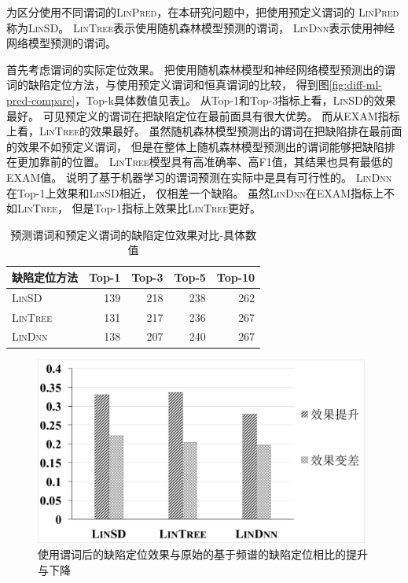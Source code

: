 为区分使用不同谓词的\textsc{LinPred}，在本研究问题中，把使用预定义谓词的 \textsc{LinPred} 称为\textsc{LinSD}。
\textsc{LinTree}表示使用随机森林模型预测的谓词，
\textsc{LinDnn}表示使用神经网络模型预测的谓词。

首先考虑谓词的实际定位效果。
把使用随机森林模型和神经网络模型预测出的谓词的缺陷定位方法，与使用预定义谓词和恒真谓词的比较，
得到图\ref{fig:diff-ml-pred-compare}，Top-k具体数值见表\ref{diff-ml-pred-compare-data}。
从Top-1和Top-3指标上看，\textsc{LinSD}的效果最好。
可见预定义的谓词在把缺陷定位在最前面具有很大优势。
而从EXAM指标上看，\textsc{LinTree}的效果最好。
虽然随机森林模型预测出的谓词在把缺陷排在最前面的效果不如预定义谓词，
但是在整体上随机森林模型预测出的谓词能够把缺陷排在更加靠前的位置。
\textsc{LinTree}模型具有高准确率、高F1值，其结果也具有最低的EXAM值。
说明了基于机器学习的谓词预测在实际中是具有可行性的。
\textsc{LinDnn}在Top-1上效果和\textsc{LinSD}相近，
仅相差一个缺陷。
虽然\textsc{LinDnn}在EXAM指标上不如\textsc{LinTree}，
但是Top-1指标上效果比\textsc{LinTree}更好。

\begin{table}
\centering
\begin{tabular}{|l|r|r|r|r|}
\hline
缺陷定位方法 & Top-1 & Top-3 & Top-5 & Top-10 \\
\hline
\textsc{LinSD} & 139 & 218 & 238 & 262 \\
\hline
\textsc{LinTree} & 131 & 217 & 236 & 267 \\
\hline
\textsc{LinDnn} & 138 & 207 & 240 & 267 \\
\hline
\end{tabular}
\caption{预测谓词和预定义谓词的缺陷定位效果对比-具体数值}
\label{diff-ml-pred-compare-data}
\end{table}

\begin{figure}[tbp] 
\centering 
\includegraphics[width=11cm]{figure/improve-deteriorate-all} 
\caption{使用谓词后的缺陷定位效果与原始的基于频谱的缺陷定位相比的提升与下降} 
\label{fig:improve-deteriorate-all}
\end{figure}

